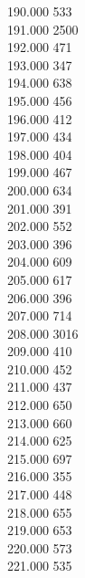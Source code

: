 { 190.000	533 \\
 191.000	2500 \\
 192.000	471 \\
 193.000	347 \\
 194.000	638 \\
 195.000	456 \\
 196.000	412 \\
 197.000	434 \\
 198.000	404 \\
 199.000	467 \\
 200.000	634 \\
 201.000	391 \\
 202.000	552 \\
 203.000	396 \\
 204.000	609 \\
 205.000	617 \\
 206.000	396 \\
 207.000	714 \\
 208.000	3016 \\
 209.000	410 \\
 210.000	452 \\
 211.000	437 \\
 212.000	650 \\
 213.000	660 \\
 214.000	625 \\
 215.000	697 \\
 216.000	355 \\
 217.000	448 \\
 218.000	655 \\
 219.000	653 \\
 220.000	573 \\
 221.000	535 \\
}
